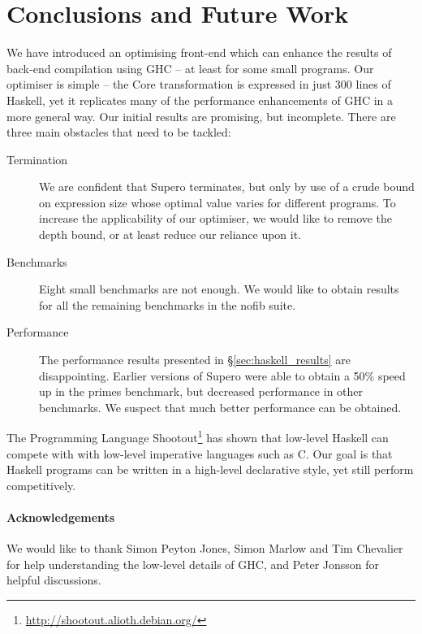 \documentclass{llncs}
\begin{document}
\section{Conclusions and Future Work}
\label{sec:conclusion}

We have introduced an optimising front-end which can enhance the results of back-end compilation using GHC -- at least for some small programs. Our optimiser is simple -- the Core transformation is expressed in just 300 lines of Haskell, yet it replicates many of the performance enhancements of GHC in a more general way. Our initial results are promising, but incomplete. There are three main obstacles that need to be tackled:

\begin{description}
\item[Termination] We are confident that Supero terminates, but only by use of a crude bound on expression size whose optimal value varies for different programs. To increase the applicability of our optimiser, we would like to remove the depth bound, or at least reduce our reliance upon it.
\item[Benchmarks] Eight small benchmarks are not enough. We would like to obtain results for all the remaining benchmarks in the nofib suite.
\item[Performance] The performance results presented in \S\ref{sec:haskell_results} are disappointing. Earlier versions of Supero were able to obtain a 50\% speed up in the primes benchmark, but decreased performance in other benchmarks. We suspect that much better performance can be obtained.
\end{description}

The Programming Language Shootout\footnote{\url{http://shootout.alioth.debian.org/}} has shown that low-level Haskell can compete with with low-level imperative languages such as C. Our goal is that Haskell programs can be written in a high-level declarative style, yet still perform competitively.

\paragraph{Acknowledgements} We would like to thank Simon Peyton Jones, Simon Marlow and Tim Chevalier for help understanding the low-level details of GHC, and Peter Jonsson for helpful discussions.




\end{document}
